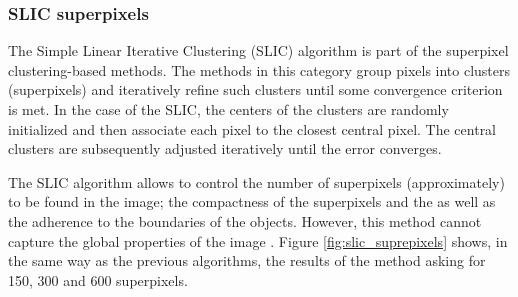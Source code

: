 \subsubsection{SLIC superpixels}
The Simple Linear Iterative Clustering (SLIC) algorithm is part of the superpixel clustering-based methods. The methods in this category group pixels into clusters (superpixels) and iteratively refine such clusters until some convergence criterion is met. In the case of the SLIC, the centers of the clusters are randomly initialized and then associate each pixel to the closest central pixel. The central clusters are subsequently adjusted iteratively until the error converges.

The SLIC algorithm allows to control the number of superpixels (approximately) to be found in the image; the compactness of the superpixels and the as well as the adherence to the boundaries of the objects. However, this method cannot capture the global properties of the image \citep{Stutz.Hermans.ea:CVIU:2018}. Figure \ref{fig:slic_suprepixels} shows, in the same way as the previous algorithms, the results of the method asking for 150, 300 and 600 superpixels.


